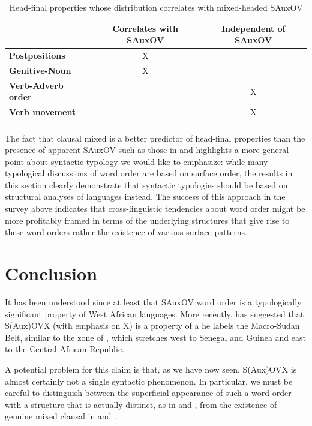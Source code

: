 \documentclass[output=paper,newtxmath,modfonts,nonflat,draftmode]{langsci/langscibook}
\begin{document}
\begin{table}
\begin{tabular}{lcc}
\lsptoprule
& \textbf{Correlates with SAuxOV} & \textbf{Independent of SAuxOV}\\
\midrule
\textbf{Postpositions} & X & \\
\textbf{Genitive-Noun} & X & \\
\textbf{Verb-Adverb order} & & X\\
\textbf{Verb movement} & & X\\	
\lspbottomrule
\end{tabular}
    \caption{Head-final properties whose distribution correlates with mixed-headed SAuxOV}\label{tab:sande:wosummary}
\end{table}

The fact that clausal mixed  is a better predictor of head-final properties than the presence of apparent SAuxOV such as those in  and  highlights a more general point about syntactic typology we would like to emphasize: while many typological discussions of word order are based on surface order, the results in this section clearly demonstrate that syntactic typologies should be based on structural analyses of languages instead. The success of this approach in the survey above indicates that cross-linguistic tendencies about word order might be more profitably framed in terms of the underlying structures that give rise to these word orders rather the existence of various surface patterns.

\section{Conclusion}\label{sec:conclusion}
It has been understood since at least \citet{heine76} that SAuxOV word order is a typologically significant property of West African languages. More recently, \citet{guld08,guld11} has suggested that S(Aux)OVX (with emphasis on X) is a property of a  he labels the Macro-Sudan Belt, similar to the  zone of \citet{clements08}, which stretches west to Senegal and Guinea and east to the Central African Republic.  

A potential problem for this claim is that, as we have now seen, S(Aux)OVX is almost certainly not a single syntactic phenomenon. In particular, we must be careful to distinguish between the superficial appearance of such a word order with a structure that is actually distinct, as in  and , from the existence of genuine mixed clausal  in  and .
\end{document}
